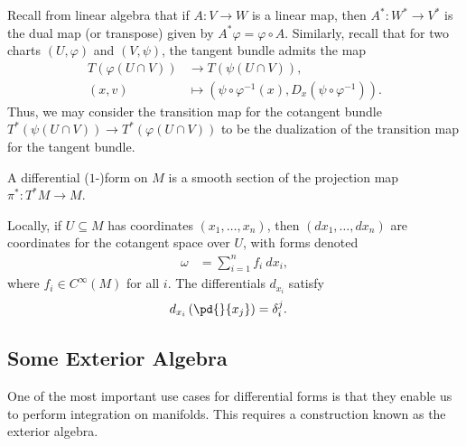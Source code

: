 \documentclass[10pt]{mypackage}
\begin{document}
Recall from linear algebra that if $A\colon V\rightarrow W$ is a linear map, then $A^{\ast}\colon W^{\ast}\rightarrow V^{\ast}$ is the dual map (or transpose) given by $A^{\ast}\varphi = \varphi\circ A$. Similarly, recall that for two charts $\left( U,\varphi \right)$ and $\left( V,\psi \right)$, the tangent bundle admits the map
\begin{align*}
  T\left( \varphi\left( U\cap V \right) \right)&\rightarrow T\left( \psi\left( U\cap V \right) \right),\\
  \left( x,v \right) &\mapsto \left( \psi\circ \varphi^{-1}\left( x \right),D_x\left( \psi\circ \varphi^{-1} \right) \right).
\end{align*}
Thus, we may consider the transition map for the cotangent bundle $T^{\ast}\left( \psi\left( U\cap V \right) \right)\rightarrow T^{\ast}\left( \varphi\left( U\cap V \right) \right)$ to be the dualization of the transition map for the tangent bundle.
\begin{definition}
  A differential ($1$-)form on $M$ is a smooth section of the projection map $\pi^{\ast}\colon T^{\ast}M\rightarrow M$.\newline

  Locally, if $U\subseteq M$ has coordinates $\left( x_1,\dots,x_n \right)$, then $\left( dx_1,\dots,dx_n \right)$ are coordinates for the cotangent space over $U$, with forms denoted
  \begin{align*}
    \omega &= \sum_{i=1}^{n}f_i\:dx_i,
  \end{align*}
  where $f_i\in C^{\infty}\left( M \right)$ for all $i$. The differentials $d_{x_i}$ satisfy
  \begin{align*}
    d_{x_i}\left( \pd{}{x_j} \right) &= \delta_{i}^{j}.
  \end{align*}
\end{definition}
\subsection{Some Exterior Algebra}%
One of the most important use cases for differential forms is that they enable us to perform integration on manifolds. This requires a construction known as the exterior algebra.\newline
\end{document}
